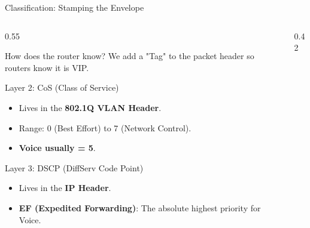 \documentclass[aspectratio=169]{beamer}  %
\begin{document}
\begin{frame}{Classification: Stamping the Envelope}
    \begin{columns}[T]
        \begin{column}{0.55\textwidth}
            \begin{block}{How does the router know?}
                \footnotesize
                We add a "Tag" to the packet header so routers know it is VIP.
            \end{block}
            \begin{exampleblock}{Layer 2: CoS (Class of Service)}
                \footnotesize
                \begin{itemize}
                    \item Lives in the \textbf{802.1Q VLAN Header}.
                    \item Range: 0 (Best Effort) to 7 (Network Control).
                    \item \textbf{Voice usually = 5}.
                \end{itemize}
            \end{exampleblock}
            \begin{exampleblock}{Layer 3: DSCP (DiffServ Code Point)}
                \footnotesize
                \begin{itemize}
                    \item Lives in the \textbf{IP Header}.
                    \item \textbf{EF (Expedited Forwarding)}: The absolute highest priority for Voice.
                \end{itemize}
            \end{exampleblock}
        \end{column}
        \begin{column}{0.42\textwidth}
            \begin{center}
            \end{center}
        \end{column}
    \end{columns}
\end{frame}
\end{document}
